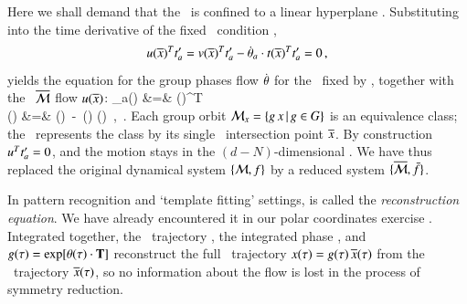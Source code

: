 \documentclass[preprint,number,sort&compress]{elsarticle}
\begin{document}
Here we shall demand that the \reducedsp\ is confined to a
linear hyperplane \slice. Substituting  into the
time derivative of the fixed \slice\ condition
,
\[
u(\overline{x})^T t'_{a} =
v(\overline{x})^T t'_{a} -
\dot{{\bf \theta}}_a \cdot
t(\overline{x})^T  t'_{a}
= 0
    \,,
\]
yields the equation for the group phases flow $\dot{{\bf \theta}}$
for the \slice\ fixed by \slicep, together with the
\reducedsp\ $\overline{\cal M}$  flow $u(\overline{x})$:
\bea
\dot{\gSpace}_a(\sspRed) &=& 
                       {\groupTan(\sspRed)^T \cdot \sliceTan{} }
\label{MFdtheta}\\
\velRed(\sspRed) &=& \vel(\sspRed)
                    \,-\, \dot{\gSpace}(\sspRed)  \cdot \groupTan(\sspRed)
    \,,\qquad\quad \sspRed \in \pSRed
\,.
\label{EqMotMFrame}
\eea
Each group orbit ${\cal M}_{x} = \{  g \, x \,|\, g
\in G \}$ is an equivalence class; the \mslices\ represents
the class by its single \slice\ intersection point $\overline{x}$.
By construction $u^T t'_{a} = 0$, and  the motion
stays in the $(d\!-\!N)$-dim\-ens\-ion\-al \slice. We have
thus replaced the original dynamical system $\{{\cal M},f\}$ by a
reduced system $\{\overline{\cal M},\bar{f}\}$.


In pattern recognition and `template fitting' settings,
 is called the {\em reconstruction equation}.
We have already encountered it in our polar coordinates
exercise . Integrated together, the
\reducedsp\ trajectory , the integrated
phase , and $g(\tau)=\exp[{\bf \theta}(\tau)
\cdot \mathbf{T}]$ reconstruct the full \statesp\ trajectory
$x(\tau)= g(\tau)\,\overline{x}(\tau)$ from the
\reducedsp\  trajectory $\overline{x}(\tau)$, so no information
about the flow is lost in the process of symmetry reduction.
\end{document}

